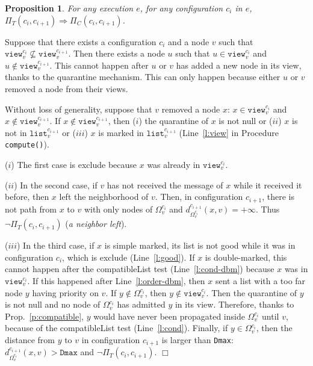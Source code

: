 \documentclass[11pt,english]{article}
\newtheorem{proposition}{Proposition}
\newenvironment{proof}[1][0cm]{
  \begin{list}{\bf Proof.~}{
      \setlength{\itemindent}{0cm}
      \setlength{\labelsep}{0cm}
      \setlength{\labelwidth}{#1}
      \setlength{\leftmargin}{#1}
    \item
    }
}{\hfill$\Box$
  \end{list}
}
\begin{document}
\begin{proposition}
  For any execution $e$, for any configuration $c_i$ in $e$, $\Pi_T(c_i,c_{i+1})
  \Rightarrow \Pi_C(c_i, c_{i+1})$.
\end{proposition}

\begin{proof}
  Suppose that there exists a configuration $c_i$ and a node $v$ such that
  $\texttt{view}_v^{c_i} \not\subseteq \texttt{view}_v^{c_{i+1}}$. Then there
  exists a node $u$ such that $u \in \texttt{view}_v^{c_i}$ and $u \not \in
  \texttt{view}_v^{c_{i+1}}$.
This cannot happen after $u$ or $v$ has added a new node in its view, thanks
  to the quarantine mechanism. This can only happen because either $u$ or $v$
  removed a node from their views.

  Without loss of generality, suppose that $v$ removed a node $x$: $x \in
  \texttt{view}_v^{c_i}$ and $x \not\in \texttt{view}_v^{c_{i+1}}$.
If $x \not\in \texttt{view}_v^{c_{i+1}}$, then ($i$) the quarantine of $x$ is
  not null or ($ii$) $x$ is not in $\texttt{list}_v^{c_{i+1}}$ or ($iii$) $x$ is
  marked in $\texttt{list}_v^{c_{i+1}}$ (Line~\ref{l:view} in Procedure
  \texttt{compute()}).

\noindent 
  ($i$) The first case is exclude because $x$ was already in
  $\texttt{view}_v^{c_i}$.

\noindent 
  ($ii$) In the second case, if $v$ has not received the message of $x$ while it
  received it before, then $x$ left the neighborhood of $v$.
  Then, in configuration $c_{i+1}$, there is not path from $x$ to
  $v$ with only nodes of $\Omega_v^{c_i}$ and $d_{\Omega_v^{c_i}}^{c_{i+1}}(x,v)
  = +\infty$. Thus $\neg\Pi_T(c_i, c_{i+1})$ (\emph{a neighbor left}).

\noindent 
  ($iii$) In the third case, if $x$ is simple marked, its list is not good while
  it was in configuration $c_i$, which is exclude (Line~\ref{l:good}). If $x$ is
  double-marked, this cannot happen after the compatibleList test
  (Line~\ref{l:cond-dbm}) because $x$ was in $\texttt{view}_v^{c_i}$. If this
  happened after Line~\ref{l:order-dbm}, then $x$ sent a list with a too far
  node $y$ having priority on $v$. If $y \not \in \Omega_v^{c_i}$, then $y \not
  \in \texttt{view}_v^{c_i}$. Then the quarantine of $y$ is not null and no node
  of $\Omega_v^{c_i}$ has admitted $y$ in its view. Therefore, thanks to
  Prop.~\ref{p:compatible}, $y$ would have never been propagated inside
  $\Omega_v^{c_i}$ until $v$, because of the compatibleList test
  (Line~\ref{l:cond}). Finally, if $y \in \Omega_v^{c_i}$, then the distance
  from $y$ to $v$ in configuration $c_{i+1}$ is larger than \texttt{Dmax}:
  $d_{\Omega_v^{c_i}}^{c_{i+1}}(x,v) > \texttt{Dmax}$ and $\neg \Pi_T(c_i,
  c_{i+1})$. \end{proof}
\end{document}
